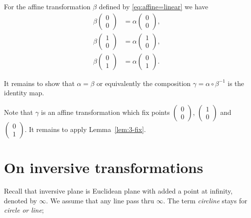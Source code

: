 For the affine transformation $\beta$ defined by \ref{eq:affine=linear}
we have 
\begin{align*}
\beta\left(\begin{smallmatrix}
0\\ 0
\end{smallmatrix} \right)
&=
\alpha\left(\begin{smallmatrix}
0\\ 0
\end{smallmatrix} \right),
\\
\beta\left(\begin{smallmatrix}
1\\ 0
\end{smallmatrix} \right)
&=
\alpha\left(\begin{smallmatrix}
1\\ 0
\end{smallmatrix} \right),
\\
\beta\left(\begin{smallmatrix}
0\\ 1
\end{smallmatrix} \right)
&=
\alpha\left(\begin{smallmatrix}
0\\ 1
\end{smallmatrix} \right).
\end{align*}


It remains to show that $\alpha=\beta$ or equivalently the composition $\gamma=\alpha\circ \beta^{-1}$ is the identity map.

Note that $\gamma$ is an affine transformation which fix points $\left(\begin{smallmatrix}
0\\ 0
\end{smallmatrix} \right)$, 
$\left(\begin{smallmatrix}
1\\ 0
\end{smallmatrix} \right)$ 
and $\left(\begin{smallmatrix}
0\\ 1
\end{smallmatrix} \right)$.
It remains to apply Lemma~\ref{lem:3-fix}.
\qeds

\section*{On inversive transformations}


Recall that inversive plane is Euclidean plane with added a point at infinity, denoted by $\infty$.
We assume that any line pass thru $\infty$.
The term {}\emph{circline} stays for {}\emph{circle or line};

